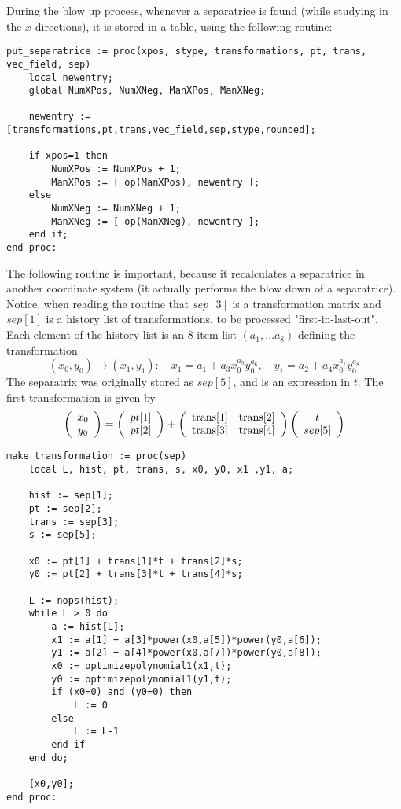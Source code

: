 \documentclass[a4paper,10pt]{article}
\begin{document}
During the blow up process, whenever a separatrice is found (while studying in the $x$-directions),
it is stored in a table, using the following routine:

\begin{lstlisting}[name=blowup]
put_separatrice := proc(xpos, stype, transformations, pt, trans, vec_field, sep)
    local newentry;
    global NumXPos, NumXNeg, ManXPos, ManXNeg;

    newentry := [transformations,pt,trans,vec_field,sep,stype,rounded];

    if xpos=1 then
        NumXPos := NumXPos + 1;
        ManXPos := [ op(ManXPos), newentry ];
    else
        NumXNeg := NumXNeg + 1;
        ManXNeg := [ op(ManXNeg), newentry ];
    end if;
end proc:
\end{lstlisting}

The following routine is important, because it recalculates a separatrice in another coordinate system (it
actually performs the blow down of a separatrice).
Notice, when reading the routine that $sep[3]$ is a transformation matrix and $sep[1]$ is a history
list of transformations, to be processed "first-in-last-out".  Each element of the history list is an $8$-item list
$(a_1,\dots a_8)$ defining the transformation
\[
    (x_0,y_0)\to (x_1,y_1)\colon\quad
    x_1 = a_1 + a_3x_0^{a_5}y_0^{a_6},\quad
    y_1 = a_2 + a_4x_0^{a_7}y_0^{a_8}
\]
The separatrix was originally stored as $sep[5]$, and is an expression in $t$.  The first transformation is
given by
\[
    \left(\begin{array}{c}x_0\\y_0\end{array}\right) =
    \left(\begin{array}{c}pt[1]\\pt[2]\end{array}\right) + \left(\begin{array}{cc} \hbox{trans}[1] & \hbox{trans}[2]    \\
    \hbox{trans}[3] & \hbox{trans}[4]\end{array}\right)
    \left(\begin{array}{c}t\\sep[5]\end{array}\right)
\]

\begin{lstlisting}[name=blowup]
make_transformation := proc(sep)
    local L, hist, pt, trans, s, x0, y0, x1 ,y1, a;

    hist := sep[1];
    pt := sep[2];
    trans := sep[3];
    s := sep[5];

    x0 := pt[1] + trans[1]*t + trans[2]*s;
    y0 := pt[2] + trans[3]*t + trans[4]*s;

    L := nops(hist);
    while L > 0 do
        a := hist[L];
        x1 := a[1] + a[3]*power(x0,a[5])*power(y0,a[6]);
        y1 := a[2] + a[4]*power(x0,a[7])*power(y0,a[8]);
        x0 := optimizepolynomial1(x1,t);
        y0 := optimizepolynomial1(y1,t);
        if (x0=0) and (y0=0) then
            L := 0
        else
            L := L-1
        end if
    end do;

    [x0,y0];
end proc:
\end{lstlisting}
\end{document}
